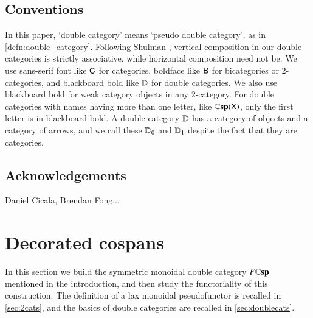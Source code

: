 \documentclass[reqno]{amsart}
\begin{document}
\subsection*{Conventions}

In this paper, `double category' means `pseudo double category', as in \cref{defn:double_category}.   Following Shulman \cite{Shulman2008}, vertical composition in our double categories is strictly associative, while horizontal composition need not be. We use sans-serif font like $\mathsf{C}$ for categories, boldface like $\mathsf{B}$ for bicategories or 2-categories, and blackboard bold like $\mathbf{\mathbb D}$ for double categories. We also use blackboard
bold for weak category objects in any 2-category.  For double categories with names having more than one letter, like $\mathbf{\mathbb Csp}(\mathsf{X})$, only the first letter is in blackboard bold.  A double category $\mathbf{\mathbb D}$ has a category of objects and a category of arrows, and we call these $\mathbf{\mathbb D}_0$ and $\mathbf{\mathbb D}_1$ despite the fact that they are categories.


\subsection*{Acknowledgements}
Daniel Cicala, Brendan Fong...



\section{Decorated cospans}\label{DecCospansDoubleCat}

In this section we build the symmetric monoidal double category $F \mathbf{\mathbb Csp}$ mentioned in the introduction, and then study the functoriality of this construction.   The definition of a lax monoidal pseudofunctor is recalled in \cref{sec:2cats}, and the basics of double categories are recalled in \cref{sec:doublecats}.
\end{document}
